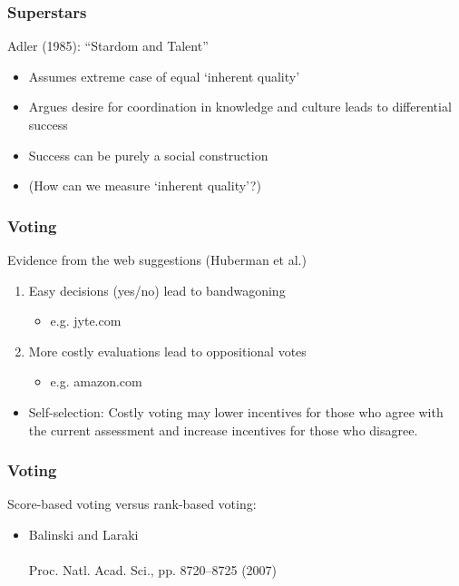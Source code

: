 \begin{frame}
  \frametitle{Superstars}
 
  \begin{block}{Adler (1985): \alert{``Stardom and Talent''}\cite{adler1985a}}
    \begin{itemize}
    \item<+-> 
      Assumes extreme case of equal `inherent quality'
    \item<+-> 
      Argues desire for coordination in knowledge and culture
      leads to differential success
    \item<+-> 
      Success can be purely a social construction
    \item<+-> 
      (How can we measure `inherent quality'?)
    \end{itemize}
  \end{block}
  
\end{frame}

\begin{frame}
  \frametitle{Voting}
 
  \begin{block}{Evidence from the web suggestions (Huberman et al.)}
    \begin{enumerate}
    \item Easy decisions (yes/no) lead to bandwagoning
      \begin{itemize}
      \item e.g. jyte.com
      \end{itemize}
    \item More costly evaluations lead to oppositional votes
      \begin{itemize}
      \item e.g. amazon.com
      \end{itemize}
    \end{enumerate}
    \begin{itemize}
    \item \alert{Self-selection:} Costly voting may lower incentives for those
      who agree with the current assessment and increase
      incentives for those who disagree.
    \end{itemize}
  \end{block}
  
\end{frame}

\begin{frame}
  \frametitle{Voting}
 
  \begin{block}{Score-based voting versus rank-based voting:}
    \begin{itemize}
    \item 
      Balinski and Laraki\cite{balinski2007a}\\
      \\
      Proc. Natl. Acad. Sci., pp. 8720--8725 (2007)
    \end{itemize}
    
  \end{block}
  


\end{frame}

